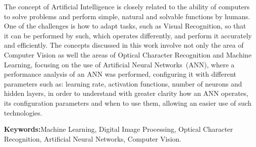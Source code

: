 \documentclass[12pt,oneside,a4paper,chapter=TITLE,section=TITLE,sumario
		=tradicional]{abntex2}
\begin{document}
		\begin{resumo}[ABSTRACT]

			The concept of Artificial Intelligence is closely related to the ability of computers to solve problems and perform simple, natural and solvable functions by humans. One of the challenges is how to adapt tasks, such as Visual Recognition, so that it can be performed by such, which operates differently, and perform it accurately and efficiently. The concepts discussed in this work involve not only the area of Computer Vision as well the areas of Optical Character Recognition and Machine Learning, focusing on the use of Artificial Neural Networks~(ANN), where a performance analysis of an ANN was performed, configuring it with different parameters such as: learning rate, activation functions, number of neurons and hidden layers, in order to understand with greater clarity how an ANN operates, its configuration parameters and when to use them, allowing an easier use of such technologies.	
			
			\vspace{0.5cm}
			\textbf{Keywords:\hspace{0.2cm}}{Machine Learning, Digital Image Processing, Optical Character Recognition, Artificial Neural Networks, Computer Vision.} 
		\end{resumo}
			
		\listadefiguras
		\listadequadros
		\listadealgoritmos
		
\end{document}
